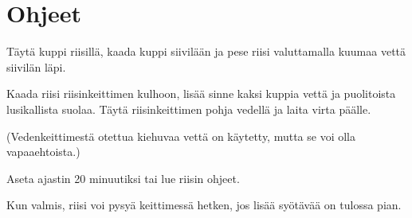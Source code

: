 \documentclass[a4paper,twocolumn]{artikel3}
\begin{document}
\section*{Ohjeet}

Täytä kuppi riisillä, kaada kuppi siivilään ja pese riisi valuttamalla kuumaa vettä siivilän läpi.

Kaada riisi riisinkeittimen kulhoon, lisää sinne kaksi kuppia vettä ja puolitoista lusikallista suolaa. Täytä riisinkeittimen pohja vedellä ja laita virta päälle.

(Vedenkeittimestä otettua kiehuvaa vettä on käytetty, mutta se voi olla vapaaehtoista.)

Aseta ajastin 20 minuutiksi tai lue riisin ohjeet.

Kun valmis, riisi voi pysyä keittimessä hetken, jos lisää syötävää on tulossa pian.
\end{document}
